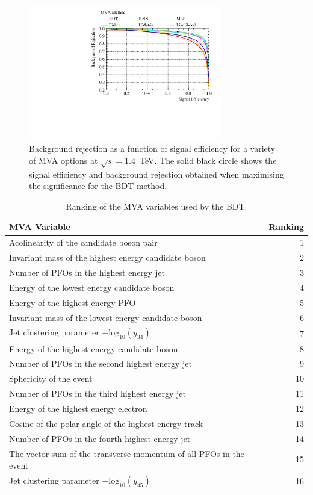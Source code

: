 \begin{figure}
\centering
\includegraphics[width=0.75\textwidth]{PhysicsAnalysis/Plots/MVAPlots/1400GeV/ThesisPlotMVAAlternatives1400GeV.pdf}
\caption[Background rejection as a function of signal efficiency for a variety of MVA options at $\sqrt{s}=1.4$~TeV.]{Background rejection as a function of signal efficiency for a variety of MVA options at $\sqrt{s}=1.4$~TeV.  {The solid black circle shows the signal efficiency and background rejection obtained when maximising the significance for the BDT method.}}
\label{fig:mvaalternatives1400GeV}
\end{figure}

\begin{table}[h!]
\centering
\begin{tabular}{ l r }
\hline
MVA Variable & Ranking \\
\hline
Acolinearity of the candidate boson pair & 1 \\
Invariant mass of the highest energy candidate boson & 2 \\
Number of PFOs in the highest energy jet & 3 \\
Energy of the lowest energy candidate boson & 4 \\
Energy of the highest energy PFO & 5 \\
Invariant mass of the lowest energy candidate boson & 6 \\
Jet clustering parameter $-\text{log}_{10}(y_{34})$ & 7 \\
Energy of the highest energy candidate boson & 8 \\
Number of PFOs in the second highest energy jet & 9 \\
Sphericity of the event & 10 \\
Number of PFOs in the third highest energy jet & 11 \\
Energy of the highest energy electron & 12 \\
Cosine of the polar angle of the highest energy track & 13 \\
Number of PFOs in the fourth highest energy jet & 14 \\
The vector sum of the transverse momentum of all PFOs in the event & 15 \\
Jet clustering parameter $-\text{log}_{10}(y_{45})$ & 16 \\
\hline
\end{tabular}
\caption[Ranking of the MVA variables used by the BDT.]{{Ranking of the MVA variables used by the BDT.}}
\label{table:mvaranking1400GeV}
\end{table}

